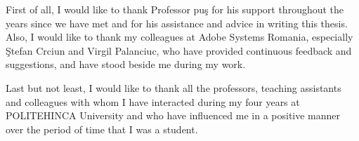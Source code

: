 \documentclass[a4paper,5pt]{thesis.cs.pub.ro}
\begin{document}
\author{Andrei-Bogdan Prvu}
\date{July 2014}



\begin{acknowledgements}
\vspace*{7cm}
\begin{center}
\parbox{10cm}{First of all, I would like to thank Professor pu\c{s} for his support throughout the years since we have met and for his assistance and advice in writing this thesis. Also, I would like to thank my colleagues at Adobe Systems Romania, especially \c{S}tefan Crciun and Virgil Palanciuc, who have provided continuous feedback and suggestions, and have stood beside me during my work.}
\end{center}
\vspace{0.3cm}
\begin{center}
\parbox{10cm}{Last but not least, I would like to thank all the professors, teaching assistants and colleagues with whom I have interacted during my four years at POLITEHINCA University and who have influenced me in a positive manner over the period of time that I was a student.}
\end{center}
\end{acknowledgements}
\end{document}
